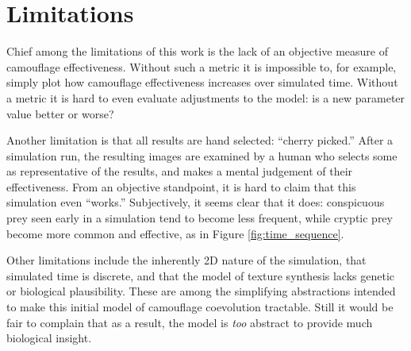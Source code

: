 \documentclass[letterpaper]{article}
\begin{document}

\section{Limitations}
\label{subsec:limitations}
Chief among the limitations of this work is the lack of an objective measure of camouflage effectiveness. Without such a metric it is impossible to, for example, simply plot how camouflage effectiveness increases over simulated time. Without a metric it is hard to even evaluate adjustments to the model: is a new parameter value better or worse?
\par
Another limitation is that all results are hand selected: “cherry picked.” After a simulation run, the resulting images are examined by a human who selects some as representative of the results, and makes a mental judgement of their effectiveness. From an objective standpoint, it is hard to claim that this simulation even “works.” Subjectively, it seems clear that it does: conspicuous prey seen early in a simulation tend to become less frequent, while cryptic prey become more common and effective, as in Figure \ref{fig:time_sequence}.
\par
Other limitations include the inherently 2D nature of the simulation, that simulated time is discrete, and that the model of texture synthesis lacks genetic or biological plausibility. These are among the simplifying abstractions intended to make this initial model of camouflage coevolution tractable. Still it would be fair to complain that as a result, the model is \textit{too} abstract to provide much biological insight.
\par

\end{document}
